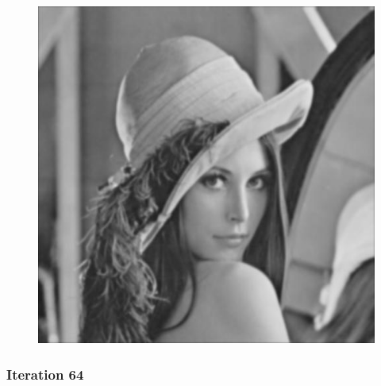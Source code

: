 \documentclass[11pt]{article}
\makeatletter
\def\maxwidth{\ifdim\Gin@nat@width>\linewidth\linewidth
    \else\Gin@nat@width\fi}
\let\Oldincludegraphics\includegraphics
\renewcommand{\includegraphics}[1]{\Oldincludegraphics[width=.8\maxwidth]{#1}}
\makeatother
\begin{document}
\begin{figure}[!htbp]
	\centering
	\includegraphics{"31th iterations_varying"}
	\label{fig:31th-iterationsvarying}
\end{figure}
\clearpage
    \hypertarget{iteration-64}{%
\subsubsection{Iteration 64}\label{iteration-64}}
\end{document}
